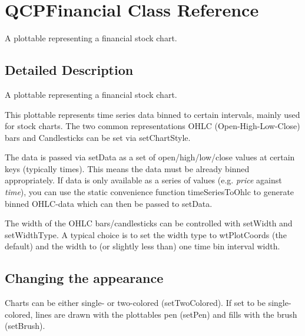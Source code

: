 \hypertarget{class_q_c_p_financial}{}\section{Q\+C\+P\+Financial Class Reference}
\label{class_q_c_p_financial}


A plottable representing a financial stock chart.  




\subsection{Detailed Description}
A plottable representing a financial stock chart. 



This plottable represents time series data binned to certain intervals, mainly used for stock charts. The two common representations O\+H\+LC (Open-\/\+High-\/\+Low-\/\+Close) bars and Candlesticks can be set via set\+Chart\+Style.

The data is passed via set\+Data as a set of open/high/low/close values at certain keys (typically times). This means the data must be already binned appropriately. If data is only available as a series of values (e.\+g. {\itshape price} against {\itshape time}), you can use the static convenience function time\+Series\+To\+Ohlc to generate binned O\+H\+L\+C-\/data which can then be passed to set\+Data.

The width of the O\+H\+LC bars/candlesticks can be controlled with set\+Width and set\+Width\+Type. A typical choice is to set the width type to wt\+Plot\+Coords (the default) and the width to (or slightly less than) one time bin interval width.\hypertarget{class_q_c_p_financial_qcpfinancial-appearance}{}\subsection{Changing the appearance}\label{class_q_c_p_financial_qcpfinancial-appearance}
Charts can be either single-\/ or two-\/colored (set\+Two\+Colored). If set to be single-\/colored, lines are drawn with the plottable\textquotesingle{}s pen (set\+Pen) and fills with the brush (set\+Brush).


